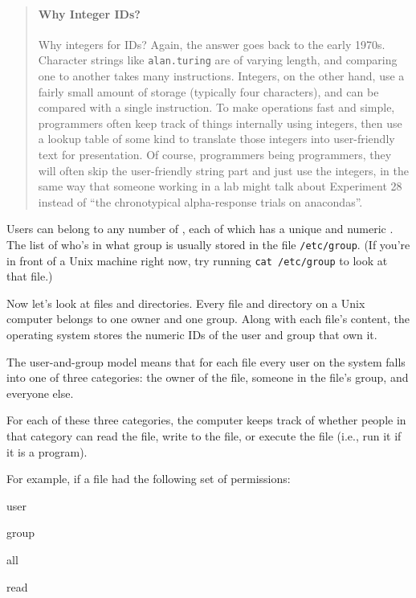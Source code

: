 \documentclass{book}
\begin{document}
\begin{quote}
\mbox{}\paragraph{Why Integer IDs?}

Why integers for IDs? Again, the answer goes back to the early 1970s.
Character strings like \texttt{alan.turing} are of varying length, and
comparing one to another takes many instructions. Integers, on the other
hand, use a fairly small amount of storage (typically four characters),
and can be compared with a single instruction. To make operations fast
and simple, programmers often keep track of things internally using
integers, then use a lookup table of some kind to translate those
integers into user-friendly text for presentation. Of course,
programmers being programmers, they will often skip the user-friendly
string part and just use the integers, in the same way that someone
working in a lab might talk about Experiment 28 instead of ``the
chronotypical alpha-response trials on anacondas''.
\end{quote}

Users can belong to any number of , each
of which has a unique  and
numeric . The list of who's in what
group is usually stored in the file \texttt{/etc/group}. (If you're in
front of a Unix machine right now, try running \texttt{cat /etc/group}
to look at that file.)

Now let's look at files and directories. Every file and directory on a
Unix computer belongs to one owner and one group. Along with each file's
content, the operating system stores the numeric IDs of the user and
group that own it.

The user-and-group model means that for each file every user on the
system falls into one of three categories: the owner of the file,
someone in the file's group, and everyone else.

For each of these three categories, the computer keeps track of whether
people in that category can read the file, write to the file, or execute
the file (i.e., run it if it is a program).

For example, if a file had the following set of permissions:

user

group

all

read
\end{document}
